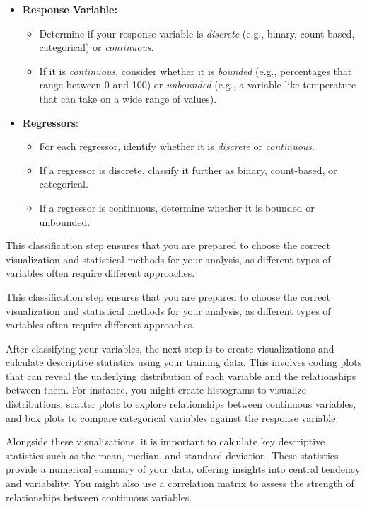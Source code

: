 \documentclass[
  letterpaper,
  DIV=11,
  numbers=noendperiod]{scrreprt}
\providecommand{\tightlist}{%
  \setlength{\itemsep}{0pt}\setlength{\parskip}{0pt}}\usepackage{longtable,booktabs,array}
\begin{document}
\begin{itemize}
\tightlist
\item
  \textbf{Response Variable:}

  \begin{itemize}
  \tightlist
  \item
    Determine if your response variable is \emph{discrete} (e.g.,
    binary, count-based, categorical) or \emph{continuous}.
  \item
    If it is \emph{continuous}, consider whether it is \emph{bounded}
    (e.g., percentages that range between 0 and 100) or \emph{unbounded}
    (e.g., a variable like temperature that can take on a wide range of
    values).
  \end{itemize}
\item
  \textbf{Regressors}:

  \begin{itemize}
  \tightlist
  \item
    For each regressor, identify whether it is \emph{discrete} or
    \emph{continuous}.
  \item
    If a regressor is discrete, classify it further as binary,
    count-based, or categorical.
  \item
    If a regressor is continuous, determine whether it is bounded or
    unbounded.
  \end{itemize}
\end{itemize}

This classification step ensures that you are prepared to choose the
correct visualization and statistical methods for your analysis, as
different types of variables often require different approaches.

This classification step ensures that you are prepared to choose the
correct visualization and statistical methods for your analysis, as
different types of variables often require different approaches.

After classifying your variables, the next step is to create
visualizations and calculate descriptive statistics using your training
data. This involves coding plots that can reveal the underlying
distribution of each variable and the relationships between them. For
instance, you might create histograms to visualize distributions,
scatter plots to explore relationships between continuous variables, and
box plots to compare categorical variables against the response
variable.

Alongside these visualizations, it is important to calculate key
descriptive statistics such as the mean, median, and standard deviation.
These statistics provide a numerical summary of your data, offering
insights into central tendency and variability. You might also use a
correlation matrix to assess the strength of relationships between
continuous variables.
\end{document}
